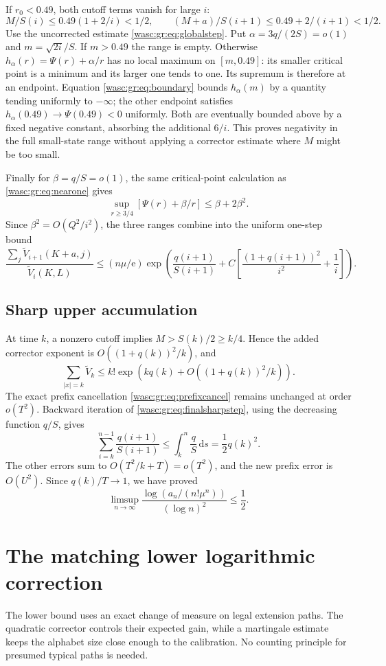 \documentclass[11pt,a4paper]{article}
\theoremstyle{remark}\newtheorem{remark}[theorem]{Remark}
\newcommand{\dd}{\,\mathrm d}\newcommand{\ee}{\mathrm e}\newcommand{\Wc}{\mathcal W}
\numberwithin{equation}{section}
\begin{document}
If $r_0<0.49$, both cutoff terms vanish for large $i$:
\[
M/S(i)\le0.49(1+2/i)<1/2,\qquad
(M+a)/S(i+1)\le0.49+2/(i+1)<1/2.
\]
Use the uncorrected estimate \eqref{wasc:gr:eq:globalstep}. Put $\alpha=3q/(2S)=o(1)$ and $m=\sqrt{2i}/S$. If $m>0.49$ the range is empty. Otherwise $h_\alpha(r)=\Psi(r)+\alpha/r$ has no local maximum on $[m,0.49]$: its smaller critical point is a minimum and its larger one tends to one. Its supremum is therefore at an endpoint. Equation \eqref{wasc:gr:eq:boundary} bounds $h_\alpha(m)$ by a quantity tending uniformly to $-\infty$; the other endpoint satisfies $h_\alpha(0.49)\to\Psi(0.49)<0$ uniformly. Both are eventually bounded above by a fixed negative constant, absorbing the additional $6/i$. This proves negativity in the full small-state range without applying a corrector estimate where $M$ might be too small.

Finally for $\beta=q/S=o(1)$, the same critical-point calculation as \eqref{wasc:gr:eq:nearone} gives
\[
\sup_{r\ge3/4}[\Psi(r)+\beta/r]\le\beta+2\beta^2.
\]
Since $\beta^2=O(Q^2/i^2)$, the three ranges combine into the uniform one-step bound
\begin{equation}\label{wasc:gr:eq:finalsharpstep}
\frac{\sum_j\widetilde V_{i+1}(K+a,j)}{\widetilde V_i(K,L)}
\le(n\mu/\ee)\exp\!\left(\frac{q(i+1)}{S(i+1)}
+C\left[\frac{(1+q(i+1))^2}{i^2}+\frac1i\right]\right).
\end{equation}

\subsection{Sharp upper accumulation}
At time $k$, a nonzero cutoff implies $M>S(k)/2\ge k/4$. Hence the added corrector exponent is $O((1+q(k))^2/k)$, and
\[
\sum_{|x|=k}\widetilde V_k\le k!\exp\!\left(kq(k)+O((1+q(k))^2/k)\right).
\]
The exact prefix cancellation \eqref{wasc:gr:eq:prefixcancel} remains unchanged at order $o(T^2)$. Backward iteration of \eqref{wasc:gr:eq:finalsharpstep}, using the decreasing function $q/S$, gives
\[
\sum_{i=k}^{n-1}\frac{q(i+1)}{S(i+1)}\le\int_k^n\frac qS\dd s=\frac12q(k)^2.
\]
The other errors sum to $O(T^2/k+T)=o(T^2)$, and the new prefix error is $O(U^2)$. Since $q(k)/T\to1$, we have proved
\begin{equation}\label{wasc:gr:eq:halfupper}
\limsup_{n\to\infty}\frac{\log(a_n/(n!\mu^n))}{(\log n)^2}\le\frac12.
\end{equation}

\section{The matching lower logarithmic correction}\label{wasc:gr:sec:matchinglower}
The lower bound uses an exact change of measure on legal extension paths. The quadratic corrector controls their expected gain, while a martingale estimate keeps the alphabet size close enough to the calibration. No counting principle for presumed typical paths is needed.
\end{document}
